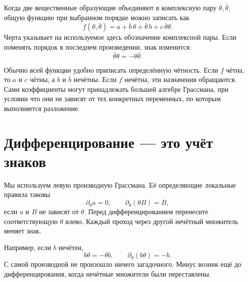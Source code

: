 Когда две вещественные образующие объединяют в комплексную пару \(\theta,\bar\theta\), общую функцию при выбранном порядке можно записать как
\begin{equation}
f(\theta,\bar\theta)
=a+\bar b\,\theta+\bar\theta\,b+c\,\bar\theta\theta.
\end{equation}
Черта указывает на используемое здесь обозначение комплексной пары. Если поменять порядок в последнем произведении, знак изменится:
\begin{equation}
\bar\theta\theta=-\theta\bar\theta.
\end{equation}

Обычно всей функции удобно приписать определённую чётность. Если \(f\) чётна, то \(a\) и \(c\) чётны, а \(b\) и \(\bar b\) нечётны. Если \(f\) нечётна, эти назначения обращаются. Сами коэффициенты могут принадлежать большей алгебре Грассмана, при условии что они не зависят от тех конкретных переменных, по которым выполняется разложение.

\begin{classroomqa}
\end{classroomqa}

\section{Дифференцирование — это учёт знаков}

Мы используем левую производную Грассмана. Её определяющие локальные правила таковы
\begin{equation}
\partial_\theta a=0,
\qquad
\partial_\theta(\theta B)=B,
\end{equation}
если \(a\) и \(B\) не зависят от \(\theta\). Перед дифференцированием перенесите соответствующую \(\theta\) влево. Каждый проход через другой нечётный множитель меняет знак.

Например, если \(b\) нечётен,
\begin{equation}
b\theta=-\theta b,
\qquad
\partial_\theta(b\theta)=-b.
\end{equation}
С самой производной не произошло ничего загадочного. Минус возник ещё до дифференцирования, когда нечётные множители были переставлены.

